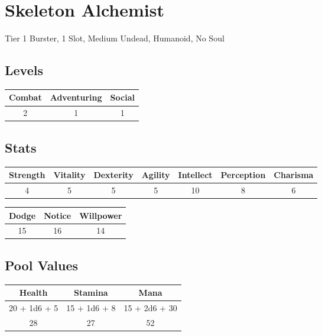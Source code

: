 \section{Skeleton Alchemist}
Tier 1 Burster, 1 Slot, Medium Undead, Humanoid, No Soul\\

\subsection{Levels}
\begin{minipage}[H]{1\textwidth}
    \centering
    \begin{tabular}[c]{|c | c | c|}
        \hline
        Combat & Adventuring & Social\\
        \hline
        2 & 1 & 1\\
        \hline
    \end{tabular}
\end{minipage}

\subsection{Stats}
\begin{minipage}[H]{1\textwidth}
    \centering
    \begin{tabular}[c]{|c | c | c | c | c | c | c|}
        \hline
        Strength & Vitality & Dexterity & Agility & Intellect & Perception & Charisma\\
        \hline
        4 & 5 & 5 & 5 & 10 & 8 & 6\\
        \hline
    \end{tabular}
\end{minipage}

\begin{minipage}[H]{1\textwidth}
    \centering
    \begin{tabular}[c]{|c | c | c|}
        \hline
        Dodge & Notice & Willpower\\
        \hline
        15 & 16 & 14\\
        \hline
    \end{tabular}
\end{minipage}

\subsection{Pool Values}
\begin{minipage}[H]{1\textwidth}
    \centering
    \begin{tabular}[c]{|c | c | c|}
        \hline
        Health & Stamina & Mana\\
        \hline
        20 + 1d6 + 5 & 15 + 1d6 + 8 & 15 + 2d6 + 30\\
        28 & 27 & 52\\
        \hline
    \end{tabular}
\end{minipage}


